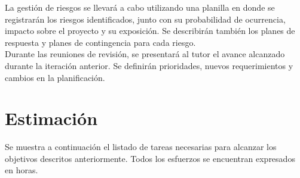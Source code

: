 \documentclass[
11pt, %
oneside, %
spanish, %
singlespacing, %
headsepline, %
chapterinoneline, %
]{MastersDoctoralThesis} %
\begin{document}
La gestión de riesgos se llevará a cabo utilizando una planilla en donde se registrarán los riesgos identificados, junto con su probabilidad de ocurrencia, impacto sobre el proyecto y su exposición. Se describirán también los planes de respuesta y planes de contingencia para cada riesgo. \\

Durante las reuniones de revisión, se presentará al tutor el avance alcanzado durante la iteración anterior. Se definirán prioridades, nuevos requerimientos y cambios en la planificación.

\section{Estimaci\'on} \label{estimacion}

Se muestra a continuación el listado de tareas necesarias para alcanzar los objetivos descritos anteriormente. Todos los esfuerzos se encuentran expresados en horas.
\end{document}
